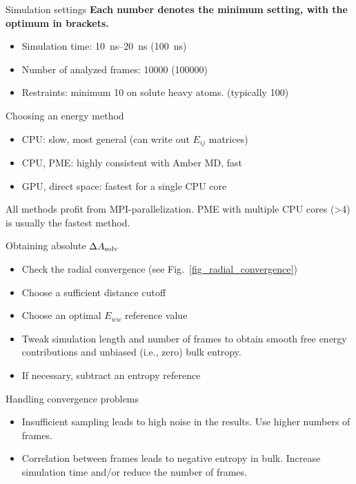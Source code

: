 \documentclass[9pt,tutorial]{livecoms}
\begin{document}
\begin{Checklists}[H]
	
	\begin{checklist}{Simulation settings}
		\textbf{Each number denotes the minimum setting, with the optimum in brackets.}
		\begin{itemize}
			\item Simulation time: \SIrange{10}{20}{\nano\second} (\SI{100}{\nano\second})
			\item Number of analyzed frames: \num{10000} (\num{100000})
			\item Restraints: minimum \SI{10}{\kcalPerMolASqr} on solute heavy atoms. (typically \SI{100}{\kcalPerMolASqr})
		\end{itemize}
	\end{checklist}
	
	\begin{checklist}{Choosing an energy method}
		\begin{itemize}
			\item CPU: slow, most general (can write out $E_{ij}$ matrices)
			\item CPU, PME: highly consistent with Amber MD, fast
			\item GPU, direct space: fastest for a single CPU core
		\end{itemize}
	   
	All methods profit from MPI-parallelization.   
	PME with multiple CPU cores (>4) is usually the fastest method.
	\end{checklist}
	
	\begin{checklist}{Obtaining absolute $\Delta A_\textup{solv}$}
		\begin{itemize}
			\item Check the radial convergence (see Fig.~\ref{fig_radial_convergence})
			\item Choose a sufficient distance cutoff
			\item Choose an optimal $E_{ww}$ reference value
			\item Tweak simulation length and number of frames to obtain smooth free energy contributions and unbiased (i.e., zero) bulk entropy.
			\item If necessary, subtract an entropy reference
		\end{itemize}
	\end{checklist}
	
	\begin{checklist}{Handling convergence problems}
		\begin{itemize}
			\item Insufficient sampling leads to high noise in the results. Use higher numbers of frames.
			\item Correlation between frames leads to negative entropy in bulk. Increase simulation time and/or reduce the number of frames.
		\end{itemize}
	\end{checklist}
	

\end{Checklists}
\end{document}
